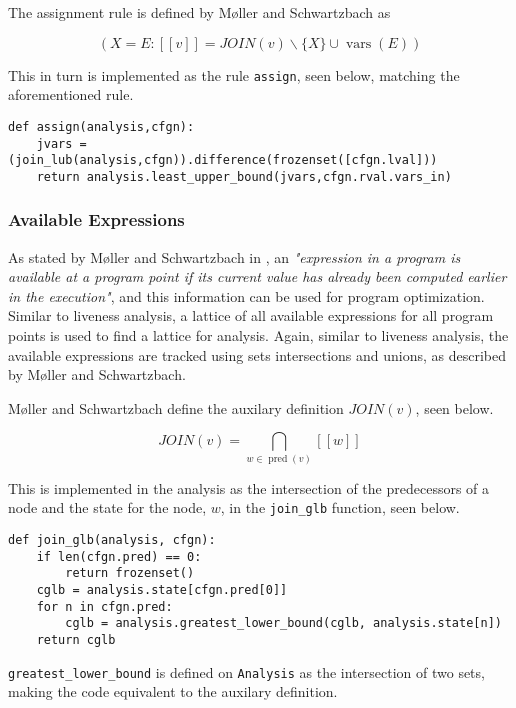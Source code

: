 \noindent The assignment rule is defined by Møller and Schwartzbach as

\begin{equation*}
    (X=E: [[v]] = J O I N(v) \backslash\{X\} \cup \operatorname{vars}(E))
\end{equation*}

\noindent This in turn is implemented as the rule \texttt{assign}, seen below, matching the aforementioned rule. 

\begin{verbatim}
def assign(analysis,cfgn):
    jvars = (join_lub(analysis,cfgn)).difference(frozenset([cfgn.lval]))
    return analysis.least_upper_bound(jvars,cfgn.rval.vars_in)
\end{verbatim}

\subsubsection{Available Expressions}
As stated by Møller and Schwartzbach in \cite{spa}, an \textit{"expression in a program is available at a program point if its current value has already been computed earlier in the execution"}, and this information can be used for program optimization. Similar to liveness analysis, a lattice of all available expressions for all program points is used to find a lattice for analysis. Again, similar to liveness analysis, the available expressions are tracked using sets intersections and unions, as described by Møller and Schwartzbach.

\newpar Møller and Schwartzbach define the auxilary definition $JOIN(v)$, seen below. 

\begin{equation*}
    J O I N (v) = \mathop{\bigcap}_{w \in \operatorname{pred}(v)} [[w]]
\end{equation*}

\noindent This is implemented in the analysis as the intersection of the predecessors of a node and the state for the node, $w$, in the \texttt{join\_glb} function, seen below. 

\begin{verbatim}
def join_glb(analysis, cfgn):
    if len(cfgn.pred) == 0:
        return frozenset()
    cglb = analysis.state[cfgn.pred[0]]
    for n in cfgn.pred:
        cglb = analysis.greatest_lower_bound(cglb, analysis.state[n])
    return cglb
\end{verbatim}

\noindent \texttt{greatest\_lower\_bound} is defined on \texttt{Analysis} as the intersection of two sets, making the code equivalent to the auxilary definition. 

